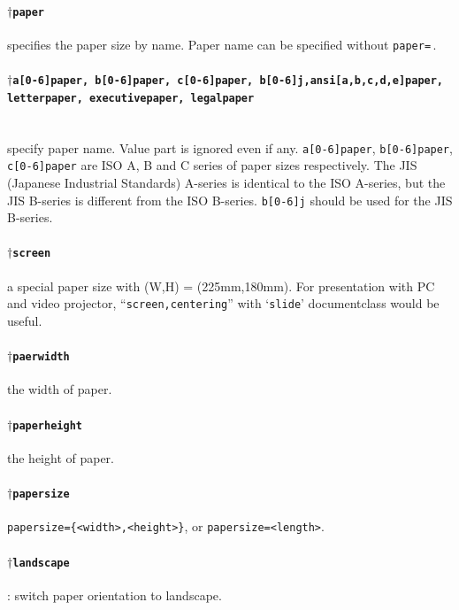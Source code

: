 \documentclass[a4paper,oneside]{book}
\begin{document}
\paragraph{$\dag$\texttt{paper}} specifies the paper size by name. Paper name can be specified without \verb|paper=|\,.

\paragraph{$\dag$\texttt{a[0-6]paper, b[0-6]paper, c[0-6]paper, b[0-6]j,ansi[a,b,c,d,e]paper,\\ letterpaper, executivepaper, legalpaper}}\hfill\\
specify paper name. Value part is ignored even if any.
\texttt{a[0-6]paper}, \texttt{b[0-6]paper}, \texttt{c[0-6]paper} are ISO A, B and C series of paper sizes respectively. The JIS (Japanese Industrial Standards) A-series is identical to the ISO A-series, but the JIS B-series is different from the ISO B-series. \texttt{b[0-6]j} should be used for the JIS B-series.

\paragraph{$\dag$\texttt{screen}} a special paper size with (W,H) = (225mm,180mm). For presentation with PC and video projector, ``\texttt{screen,centering}'' with `\texttt{slide}' documentclass would be useful.

\paragraph{$\dag$\texttt{paerwidth}} the width of paper.

\paragraph{$\dag$\texttt{paperheight}} the height of paper.

\paragraph{$\dag$\texttt{papersize}} \verb|papersize={<width>,<height>}|, or \verb|papersize=<length>|.

\paragraph{$\dag$\texttt{landscape}}: switch paper orientation to landscape.
\end{document}

